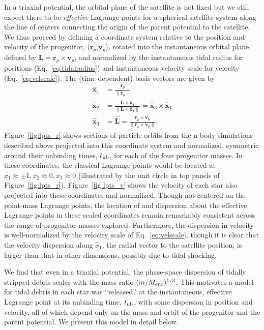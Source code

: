 \documentclass[letterpaper,12pt,preprint]{aastex}
\newcommand{\bs}{\boldsymbol}
\newcommand{\tub}{t_{\rm ub}}
\begin{document}
In a triaxial potential, the orbital plane of the satellite is not fixed but we still expect there to be \emph{effective} Lagrange points for a spherical satellite system along the line of centers connecting the origin of the parent potential to the satellite. We thus proceed by defining a coordinate system relative to the position and velocity of the progenitor, ($\bs{r}_p$,$\bs{v}_p$), rotated into the instantaneous orbital plane defined by $\bs{L} = \bs{r}_p \times \bs{v}_p$, and normalized by the instantaneous tidal radius for positions (Eq.~\ref{eq:tidalradius}) and instantaneous velocity scale for velocity (Eq.~\ref{eq:velscale}). 
The (time-dependent) basis vectors are given by
\begin{align}
	\hat{\bs{x}}_1 &= \frac{\bs{r}_p}{\|\bs{r}_p\|}\\
	\hat{\bs{x}}_2 &= \frac{\bs{L} \times \hat{\bs{x}}_1}{\|\bs{L} \times \hat{\bs{x}}_1\|} = \hat{\bs{x}}_3 \times \hat{\bs{x}}_1\\
	\hat{\bs{x}}_3 &= \hat{\bs{L}} = \frac{\bs{r}_p \times \bs{v}_p}{\|\bs{r}_p \times \bs{v}_p\|}.
\end{align}
Figure~\ref{fig:lpts_r} shows sections of particle orbits from the n-body simulations described above projected into this coordinate system and normalized, symmetric around their unbinding times, $\tub$, for each of the four progenitor masses. In these coordinates, the classical Lagrange points would be located at $x_1\approx\pm1,x_2\approx0,x_3\approx0$ (illustrated by the unit circle in top panels of Figure~\ref{fig:lpts_r}). Figure~\ref{fig:lpts_v} shows the velocity of each star also projected into these coordinates and normalized. Though not centered on the point-mass Lagrange points, the location of and dispersion about the effective Lagrange points in these scaled coordinates remain remarkably consistent across the range of progenitor masses explored. Furthermore, the dispersion in velocity is well-normalized by the velocity scale of Eq.~\ref{eq:velscale}, though it is clear that the velocity dispersion along $\hat{x}_1$, the radial vector to the satellite position, is larger than that in other dimensions, possibly due to tidal shocking. 

We find that even in a triaxial potential, the phase-space dispersion of tidally stripped debris scales with the mass ratio $(m / M_{\rm enc})^{1/3}$. This motivates a model for tidal debris in each star was ``released'' at the instantaneous, effective Lagrange point at its unbinding time, $\tub$, with some dispersion in position and velocity, all of which depend only on the mass and orbit of the progenitor and the parent potential. We present this model in detail below.
\end{document}
